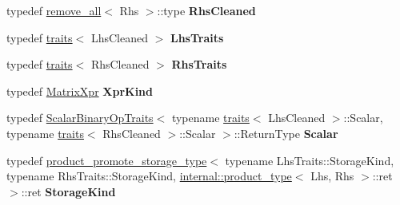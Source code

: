 \begin{DoxyCompactItemize}
typedef \mbox{\hyperlink{struct_eigen_1_1internal_1_1remove__all}{remove\+\_\+all}}$<$ Rhs $>$\+::type {\bfseries Rhs\+Cleaned}
\item 
\mbox{\label{struct_eigen_1_1internal_1_1traits_3_01_product_3_01_lhs_00_01_rhs_00_01_option_01_4_01_4_a2558de0f7d3f7e00f3e129406665a1dc}} 
typedef \mbox{\hyperlink{struct_eigen_1_1internal_1_1traits}{traits}}$<$ Lhs\+Cleaned $>$ {\bfseries Lhs\+Traits}
\item 
\mbox{\label{struct_eigen_1_1internal_1_1traits_3_01_product_3_01_lhs_00_01_rhs_00_01_option_01_4_01_4_a5c368e4a12fcde66f08ea07ab706c037}} 
typedef \mbox{\hyperlink{struct_eigen_1_1internal_1_1traits}{traits}}$<$ Rhs\+Cleaned $>$ {\bfseries Rhs\+Traits}
\item 
\mbox{\label{struct_eigen_1_1internal_1_1traits_3_01_product_3_01_lhs_00_01_rhs_00_01_option_01_4_01_4_a120ac65f1353062ed28220521a12cbb4}} 
typedef \mbox{\hyperlink{struct_eigen_1_1_matrix_xpr}{Matrix\+Xpr}} {\bfseries Xpr\+Kind}
\item 
\mbox{\label{struct_eigen_1_1internal_1_1traits_3_01_product_3_01_lhs_00_01_rhs_00_01_option_01_4_01_4_a780b9b2fadba314795f26828b0a595f2}} 
typedef \mbox{\hyperlink{struct_eigen_1_1_scalar_binary_op_traits}{Scalar\+Binary\+Op\+Traits}}$<$ typename \mbox{\hyperlink{struct_eigen_1_1internal_1_1traits}{traits}}$<$ Lhs\+Cleaned $>$\+::Scalar, typename \mbox{\hyperlink{struct_eigen_1_1internal_1_1traits}{traits}}$<$ Rhs\+Cleaned $>$\+::Scalar $>$\+::Return\+Type {\bfseries Scalar}
\item 
\mbox{\label{struct_eigen_1_1internal_1_1traits_3_01_product_3_01_lhs_00_01_rhs_00_01_option_01_4_01_4_a6730dadec4953678689c03ff60f6ad7e}} 
typedef \mbox{\hyperlink{struct_eigen_1_1internal_1_1product__promote__storage__type}{product\+\_\+promote\+\_\+storage\+\_\+type}}$<$ typename Lhs\+Traits\+::\+Storage\+Kind, typename Rhs\+Traits\+::\+Storage\+Kind, \mbox{\hyperlink{struct_eigen_1_1internal_1_1product__type}{internal\+::product\+\_\+type}}$<$ Lhs, Rhs $>$\+::ret $>$\+::ret {\bfseries Storage\+Kind}

\end{DoxyCompactItemize}
